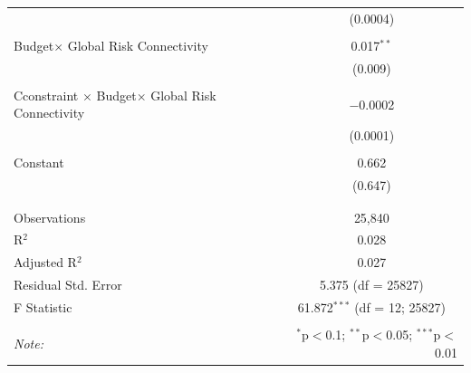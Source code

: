 \begin{table}[!htbp]
{\begin{tabular}{@{\extracolsep{5pt}}lc}
  & (0.0004) \\ 
  & \\ 
 Budget$\times$ Global Risk Connectivity  & 0.017$^{**}$ \\ 
  & (0.009) \\ 
  & \\ 
Cconstraint $\times$ Budget$\times$ Global Risk Connectivity  & $-$0.0002 \\ 
  & (0.0001) \\ 
  & \\ 
 Constant & 0.662 \\ 
  & (0.647) \\ 
  & \\ 
\hline \\[-1.8ex] 
Observations & 25,840 \\ 
R$^{2}$ & 0.028 \\ 
Adjusted R$^{2}$ & 0.027 \\ 
Residual Std. Error & 5.375 (df = 25827) \\ 
F Statistic & 61.872$^{***}$ (df = 12; 25827) \\ 
\hline 
\hline \\[-1.8ex] 
\textit{Note:}  & \multicolumn{1}{r}{$^{*}$p$<$0.1; $^{**}$p$<$0.05; $^{***}$p$<$0.01} \\ 
\end{tabular}
}
\end{table} 

\clearpage
{\footnotesize


}
\cleardoublepage
